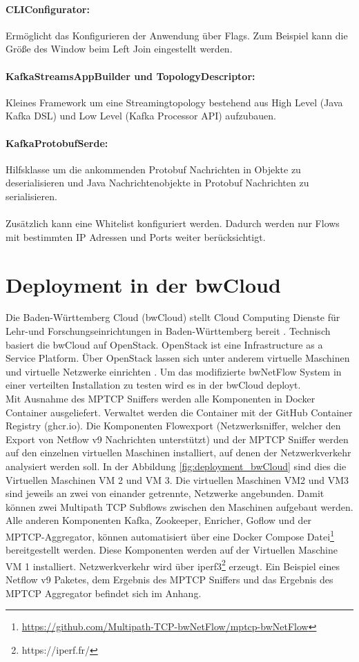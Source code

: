 \documentclass[a4paper, 12pt]{article}
\begin{document}
\paragraph{CLIConfigurator:} Ermöglicht das Konfigurieren der Anwendung über Flags. Zum Beispiel kann die Größe des Window beim Left Join eingestellt werden. 

\paragraph{KafkaStreamsAppBuilder und TopologyDescriptor:} Kleines Framework um eine Streamingtopology bestehend aus High Level (Java Kafka DSL) und Low Level (Kafka Processor API) aufzubauen.

\paragraph{KafkaProtobufSerde:} Hilfsklasse um die ankommenden Protobuf Nachrichten in Objekte zu deserialisieren und Java Nachrichtenobjekte in Protobuf Nachrichten zu serialisieren.
\\
\\
Zusätzlich kann eine Whitelist konfiguriert werden. Dadurch werden nur Flows mit bestimmten IP Adressen und Ports weiter berücksichtigt.


\section{Deployment in der bwCloud}
Die Baden-Württemberg Cloud (bwCloud) stellt Cloud Computing Dienste für Lehr-und Forschungseinrichtungen in Baden-Württemberg bereit \cite{bwcloud}.
Technisch basiert die bwCloud auf OpenStack. 
OpenStack ist eine Infrastructure as a Service Platform. Über OpenStack lassen sich unter anderem virtuelle Maschinen und virtuelle Netzwerke einrichten \cite{rosado2014overview}.
Um das modifizierte bwNetFlow System in einer verteilten Installation zu testen wird es in der bwCloud deployt.
\\
Mit Ausnahme des MPTCP Sniffers werden alle Komponenten in Docker Container ausgeliefert.
Verwaltet werden die Container mit der GitHub Container Registry (ghcr.io). 
Die Komponenten Flowexport (Netzwerksniffer, welcher den Export von Netflow v9 Nachrichten unterstützt) und der MPTCP Sniffer werden auf den einzelnen virtuellen Maschinen installiert, auf denen der Netzwerkverkehr analysiert werden soll. 
In der Abbildung \ref{fig:deployment_bwCloud} sind dies die Virtuellen Maschinen VM 2 und VM 3.
Die virtuellen Maschinen VM2 und VM3 sind jeweils an zwei von einander getrennte, Netzwerke angebunden.
Damit können zwei Multipath TCP Subflows zwischen den Maschinen aufgebaut werden. 
\\
Alle anderen Komponenten Kafka, Zookeeper, Enricher, Goflow und der MPTCP-Aggregator, können automatisiert über eine Docker Compose Datei\footnote{\url{https://github.com/Multipath-TCP-bwNetFlow/mptcp-bwNetFlow}} bereitgestellt werden. Diese Komponenten werden auf der Virtuellen Maschine VM 1 installiert.
Netzwerkverkehr wird über iperf3\footnote{https://iperf.fr/} erzeugt.
Ein Beispiel eines Netflow v9 Paketes, dem Ergebnis des MPTCP Sniffers und das Ergebnis des MPTCP Aggregator befindet sich im Anhang.
\end{document}
